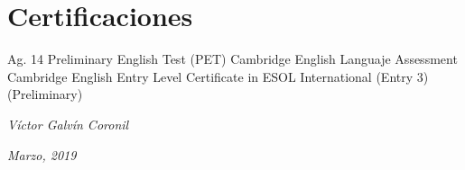 \documentclass[]{cv-class}
\begin{document}
\section{Certificaciones}
\begin{entrylist}
  \entry
    {Ag. 14}
    {Preliminary English Test (PET)}
    {Cambridge English Languaje Assessment}
    {Cambridge English Entry Level Certificate in ESOL International (Entry 3) (Preliminary)}
\end{entrylist}

\begin{flushright}
\vspace{1.20cm}
\emph{Víctor Galvín Coronil}
\end{flushright}
\begin{flushright}
\emph{Marzo, 2019}
\end{flushright}
\end{document}
